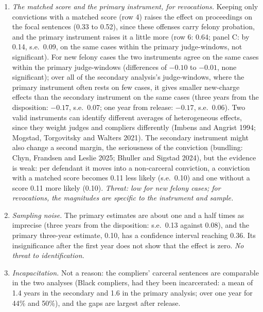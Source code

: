 \documentclass[11pt]{article}
\begin{document}
\begin{enumerate}
  \item \emph{The matched score and the primary instrument, for revocations.} Keeping only convictions with a matched score (row 4) raises the effect on proceedings on the focal sentences (0.33 to 0.52), since these offenses carry felony probation, and the primary instrument raises it a little more (row 6: 0.64; panel C: by 0.14, s.e.\ 0.09, on the same cases within the primary judge-windows, not significant). For new felony cases the two instruments agree on the same cases within the primary judge-windows (differences of $-0.10$ to $-0.01$, none significant); over all of the secondary analysis's judge-windows, where the primary instrument often rests on few cases, it gives smaller new-charge effects than the secondary instrument on the same cases (three years from the disposition: $-0.17$, s.e.\ 0.07; one year from release: $-0.17$, s.e.\ 0.06). Two valid instruments can identify different averages of heterogeneous effects, since they weight judges and compliers differently (Imbens and Angrist 1994; Mogstad, Torgovitsky and Walters 2021). The secondary instrument might also change a second margin, the seriousness of the conviction (bundling: Chyn, Frandsen and Leslie 2025; Bhuller and Sigstad 2024), but the evidence is weak: per defendant it moves into a non-carceral conviction, a conviction with a matched score becomes 0.11 less likely (s.e.\ 0.10) and one without a score 0.11 more likely (0.10). \emph{Threat: low for new felony cases; for revocations, the magnitudes are specific to the instrument and sample.}
  \item \emph{Sampling noise.} The primary estimates are about one and a half times as imprecise (three years from the disposition: s.e.\ 0.13 against 0.08), and the primary three-year estimate, 0.10, has a confidence interval reaching 0.36. Its insignificance after the first year does not show that the effect is zero. \emph{No threat to identification.}
  \item \emph{Incapacitation.} Not a reason: the compliers' carceral sentences are comparable in the two analyses (Black compliers, had they been incarcerated: a mean of 1.4 years in the secondary and 1.6 in the primary analysis; over one year for 44\% and 50\%), and the gaps are largest after release.
\end{enumerate}
\end{document}
